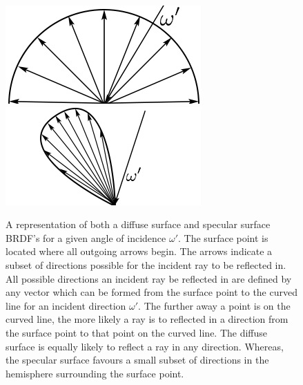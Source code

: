\documentclass[../dissertation.tex]{subfiles}
\begin{document}
\begin{figure}[h]
\centering
{}
  \includegraphics[width=\textwidth]{images/diffuse_brdf.png}   
  \label{fig:diffuse_brdf}
\endminipage\hspace{5em}
  \includegraphics[width=\textwidth]{images/specular_brdf.png}
  \label{fig:specular_brdf}
\endminipage
\caption{A representation of both a diffuse surface and specular surface BRDF's for a given angle of incidence $\omega'$. The surface point is located where all outgoing arrows begin. The arrows indicate a subset of directions possible for the incident ray to be reflected in. All possible directions an incident ray be reflected in are defined by any vector which can be formed from the surface point to the curved line for an incident direction $\omega'$. The further away a point is on the curved line, the more likely a ray is to reflected in a direction from the surface point to that point on the curved line. The diffuse surface is equally likely to reflect a ray in any direction. Whereas, the specular surface favours a small subset of directions in the hemisphere surrounding the surface point.}
\label{fig:brdfs}
\end{figure}
\end{document}
